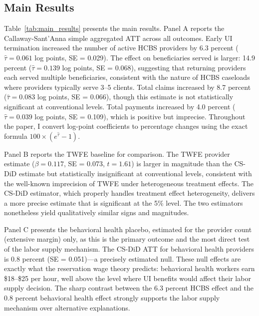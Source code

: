 \documentclass[12pt]{article}
\begin{document}
\subsection{Main Results}

Table~\ref{tab:main_results} presents the main results. Panel A reports the Callaway-Sant'Anna simple aggregated ATT across all outcomes. Early UI termination increased the number of active HCBS providers by 6.3 percent ($\hat{\tau} = 0.061$ log points, SE = 0.029). The effect on beneficiaries served is larger: 14.9 percent ($\hat{\tau} = 0.139$ log points, SE = 0.068), suggesting that returning providers each served multiple beneficiaries, consistent with the nature of HCBS caseloads where providers typically serve 3--5 clients. Total claims increased by 8.7 percent ($\hat{\tau} = 0.083$ log points, SE = 0.066), though this estimate is not statistically significant at conventional levels. Total payments increased by 4.0 percent ($\hat{\tau} = 0.039$ log points, SE = 0.109), which is positive but imprecise. Throughout the paper, I convert log-point coefficients to percentage changes using the exact formula $100 \times (e^{\hat{\tau}} - 1)$.

Panel B reports the TWFE baseline for comparison. The TWFE provider estimate ($\beta = 0.117$, SE = 0.073, $t = 1.61$) is larger in magnitude than the CS-DiD estimate but statistically insignificant at conventional levels, consistent with the well-known imprecision of TWFE under heterogeneous treatment effects. The CS-DiD estimator, which properly handles treatment effect heterogeneity, delivers a more precise estimate that is significant at the 5\% level. The two estimators nonetheless yield qualitatively similar signs and magnitudes.

Panel C presents the behavioral health placebo, estimated for the provider count (extensive margin) only, as this is the primary outcome and the most direct test of the labor supply mechanism. The CS-DiD ATT for behavioral health providers is 0.8 percent (SE = 0.051)---a precisely estimated null. These null effects are exactly what the reservation wage theory predicts: behavioral health workers earn \$18--\$25 per hour, well above the level where UI benefits would affect their labor supply decision. The sharp contrast between the 6.3 percent HCBS effect and the 0.8 percent behavioral health effect strongly supports the labor supply mechanism over alternative explanations.


\end{document}
